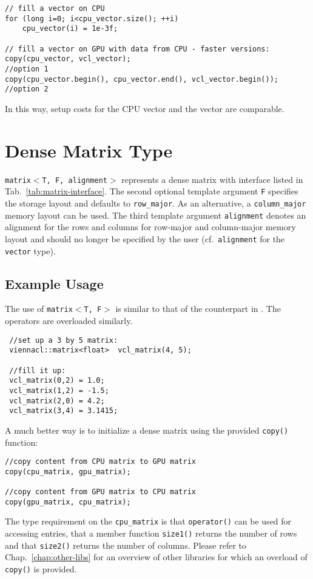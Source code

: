  \begin{lstlisting}
// fill a vector on CPU
for (long i=0; i<cpu_vector.size(); ++i)
    cpu_vector(i) = 1e-3f;

// fill a vector on GPU with data from CPU - faster versions:
copy(cpu_vector, vcl_vector);                                   //option 1
copy(cpu_vector.begin(), cpu_vector.end(), vcl_vector.begin()); //option 2
\end{lstlisting}
In this way, setup costs for the CPU vector and the {\ViennaCL} vector are comparable.

\section{Dense Matrix Type}
\texttt{matrix$<$T, F, alignment$>$} represents a dense matrix with interface listed in
Tab.~\ref{tab:matrix-interface}. The second optional template argument \texttt{F}
specifies the storage layout and defaults to \texttt{row\_major}. As an alternative, a \lstinline|column_major| memory layout can be used.
The third template argument \texttt{alignment} denotes an alignment for the rows and columns for row-major and column-major memory layout and should no longer be specified by the user (cf.~\texttt{alignment} for the \texttt{vector} type).

\subsection{Example Usage}
The use of \texttt{matrix$<$T, F$>$} is similar to that of the counterpart in {\ublas}. The operators are overloaded similarly.

\begin{lstlisting}
 //set up a 3 by 5 matrix:
 viennacl::matrix<float>  vcl_matrix(4, 5);

 //fill it up:
 vcl_matrix(0,2) = 1.0;
 vcl_matrix(1,2) = -1.5;
 vcl_matrix(2,0) = 4.2;
 vcl_matrix(3,4) = 3.1415;
\end{lstlisting}


A much better way is to initialize a dense matrix using the provided \texttt{copy()} function:
\begin{lstlisting}
//copy content from CPU matrix to GPU matrix
copy(cpu_matrix, gpu_matrix);

//copy content from GPU matrix to CPU matrix
copy(gpu_matrix, cpu_matrix);
\end{lstlisting}
The type requirement on the \texttt{cpu\_matrix} is that \texttt{operator()} can be used for accessing entries, that a member function \texttt{size1()} returns the number of rows and that \texttt{size2()} returns the number of columns.
Please refer to Chap.~\ref{chap:other-libs} for an overview of other libraries for which an overload of \texttt{copy()} is provided.

